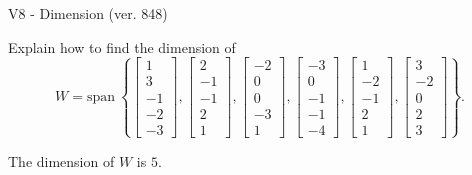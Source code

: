 \begin{exercise}
  \begin{exerciseTitle}V8 - Dimension (ver. 848)\end{exerciseTitle}
  \begin{exerciseStatement}
    Explain how to find the dimension of 
\[W=\mathrm{span}\ \left\{\left[\begin{array}{r}
1 \\
3 \\
-1 \\
-2 \\
-3
\end{array}\right] , \left[\begin{array}{r}
2 \\
-1 \\
-1 \\
2 \\
1
\end{array}\right] , \left[\begin{array}{r}
-2 \\
0 \\
0 \\
-3 \\
1
\end{array}\right] , \left[\begin{array}{r}
-3 \\
0 \\
-1 \\
-1 \\
-4
\end{array}\right] , \left[\begin{array}{r}
1 \\
-2 \\
-1 \\
2 \\
1
\end{array}\right] , \left[\begin{array}{r}
3 \\
-2 \\
0 \\
2 \\
3
\end{array}\right]\right\}.\]



  \end{exerciseStatement}
  \begin{exerciseAnswer}
   The dimension of \(W\) is  \(5\).
  


  \end{exerciseAnswer}
\end{exercise}